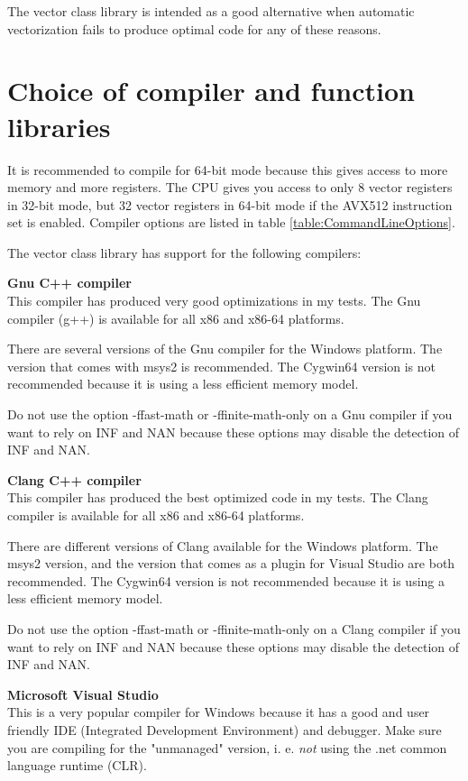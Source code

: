 \documentclass[vcl_manual.tex]{subfiles}
\begin{document}
The vector class library is intended as a good alternative when automatic vectorization fails to produce optimal code for any of these reasons.


\section{Choice of compiler and function libraries}\label{ChoiceOfCompiler}

It is recommended to compile for 64-bit mode because this gives access to more memory and more registers. The CPU gives you access to only 8 vector registers in 32-bit mode, but 32 vector registers in 64-bit mode if the AVX512 instruction set is enabled. Compiler options are listed in table \ref{table:CommandLineOptions}.

The vector class library has support for the following compilers:

\textbf{Gnu C++ compiler}\\
This compiler has produced very good optimizations in my tests. The Gnu compiler (g++) is available for all x86 and x86-64 platforms. 

There are several versions of the Gnu compiler for the Windows platform. The version that comes with msys2 is recommended. The Cygwin64 version is not recommended because it is using a less efficient memory model.

Do not use the option -ffast-math or -ffinite-math-only on a Gnu compiler if you want to rely on INF and NAN because these options may disable the detection of INF and NAN.

\textbf{Clang C++ compiler}\\
This compiler has produced the best optimized code in my tests. The Clang compiler is available for all x86 and x86-64 platforms. 

There are different versions of Clang available for the Windows platform. 
The msys2 version, and the version that comes as a plugin for Visual Studio are both recommended.
The Cygwin64 version is not recommended because it is using a less efficient memory model.

Do not use the option -ffast-math or -ffinite-math-only on a Clang compiler if you want to rely on INF and NAN because these options may disable the detection of INF and NAN.

\textbf{Microsoft Visual Studio}\\
This is a very popular compiler for Windows because it has a good and user friendly IDE (Integrated Development Environment) and debugger. Make sure you are compiling for the "unmanaged" version, i. e. \emph{not} using the .net common language runtime (CLR).
\end{document}

